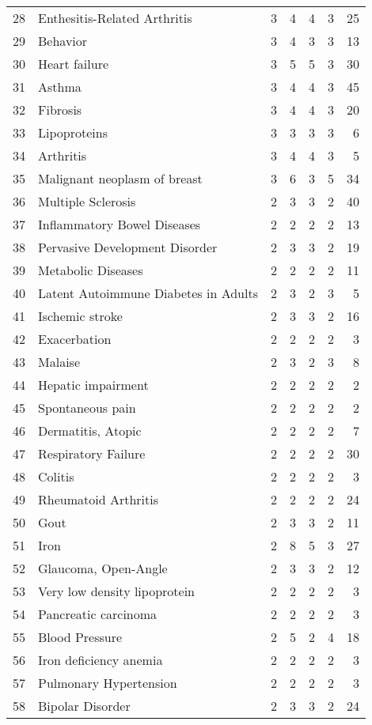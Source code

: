 \begin{tabular}{llrrrrr}
28 & Enthesitis-Related Arthritis & 3 & 4 & 4 & 3 & 25 \\
29 & Behavior & 3 & 4 & 3 & 3 & 13 \\
30 & Heart failure & 3 & 5 & 5 & 3 & 30 \\
31 & Asthma & 3 & 4 & 4 & 3 & 45 \\
32 & Fibrosis & 3 & 4 & 4 & 3 & 20 \\
33 & Lipoproteins & 3 & 3 & 3 & 3 & 6 \\
34 & Arthritis & 3 & 4 & 4 & 3 & 5 \\
35 & Malignant neoplasm of breast & 3 & 6 & 3 & 5 & 34 \\
36 & Multiple Sclerosis & 2 & 3 & 3 & 2 & 40 \\
37 & Inflammatory Bowel Diseases & 2 & 2 & 2 & 2 & 13 \\
38 & Pervasive Development Disorder & 2 & 3 & 3 & 2 & 19 \\
39 & Metabolic Diseases & 2 & 2 & 2 & 2 & 11 \\
40 & Latent Autoimmune Diabetes in Adults & 2 & 3 & 2 & 3 & 5 \\
41 & Ischemic stroke & 2 & 3 & 3 & 2 & 16 \\
42 & Exacerbation & 2 & 2 & 2 & 2 & 3 \\
43 & Malaise & 2 & 3 & 2 & 3 & 8 \\
44 & Hepatic impairment & 2 & 2 & 2 & 2 & 2 \\
45 & Spontaneous pain & 2 & 2 & 2 & 2 & 2 \\
46 & Dermatitis, Atopic & 2 & 2 & 2 & 2 & 7 \\
47 & Respiratory Failure & 2 & 2 & 2 & 2 & 30 \\
48 & Colitis & 2 & 2 & 2 & 2 & 3 \\
49 & Rheumatoid Arthritis & 2 & 2 & 2 & 2 & 24 \\
50 & Gout & 2 & 3 & 3 & 2 & 11 \\
51 & Iron & 2 & 8 & 5 & 3 & 27 \\
52 & Glaucoma, Open-Angle & 2 & 3 & 3 & 2 & 12 \\
53 & Very low density lipoprotein & 2 & 2 & 2 & 2 & 3 \\
54 & Pancreatic carcinoma & 2 & 2 & 2 & 2 & 3 \\
55 & Blood Pressure & 2 & 5 & 2 & 4 & 18 \\
56 & Iron deficiency anemia & 2 & 2 & 2 & 2 & 3 \\
57 & Pulmonary Hypertension & 2 & 2 & 2 & 2 & 3 \\
58 & Bipolar Disorder & 2 & 3 & 3 & 2 & 24 \\

\end{tabular}
